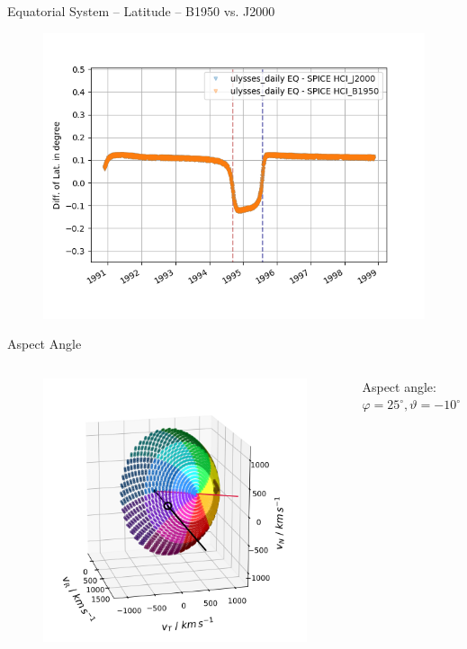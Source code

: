 \documentclass{beamer}
\begin{document}
\begin{frame}{Equatorial System -- Latitude --  B1950 vs. J2000}
\begin{figure}									
	\includegraphics[width=1\textwidth]{Pics/EQ_LAT_J_B.png}
\end{figure}
\end{frame}

\begin{frame}{Aspect Angle}
\begin{columns}
	\vspace{-0.8cm}
	\begin{figure}
		\includegraphics[scale=0.4]{Pics/col_aa_marker.png}
	\end{figure}
	\begin{center}
		{\small 	Aspect angle:\\
			$\varphi = 25 ^\circ, \vartheta = -10 ^\circ $}
	\end{center}
	
	\column[]{6cm}
	
	\column[]{1cm}
\end{columns}
\end{frame}
\end{document}
